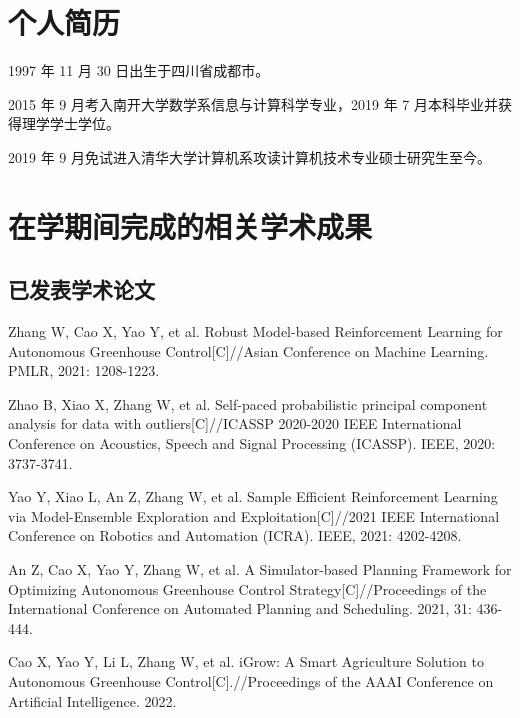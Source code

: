
\begin{resume}

  \section*{个人简历}

  1997 年 11 月 30 日出生于四川省成都市。

  2015 年 9 月考入南开大学数学系信息与计算科学专业，2019 年 7 月本科毕业并获得理学学士学位。

  2019 年 9 月免试进入清华大学计算机系攻读计算机技术专业硕士研究生至今。


  \section*{在学期间完成的相关学术成果}

  \subsection*{已发表学术论文}

  \begin{achievements}
    \item Zhang W, Cao X, Yao Y, et al. Robust Model-based Reinforcement Learning for Autonomous Greenhouse Control[C]//Asian Conference on Machine Learning. PMLR, 2021: 1208-1223.
    \item Zhao B, Xiao X, Zhang W, et al. Self-paced probabilistic principal component analysis for data with outliers[C]//ICASSP 2020-2020 IEEE International Conference on Acoustics, Speech and Signal Processing (ICASSP). IEEE, 2020: 3737-3741.
    \item Yao Y, Xiao L, An Z, Zhang W, et al. Sample Efficient Reinforcement Learning via Model-Ensemble Exploration and Exploitation[C]//2021 IEEE International Conference on Robotics and Automation (ICRA). IEEE, 2021: 4202-4208.
    \item An Z, Cao X, Yao Y, Zhang W, et al. A Simulator-based Planning Framework for Optimizing Autonomous Greenhouse Control Strategy[C]//Proceedings of the International Conference on Automated Planning and Scheduling. 2021, 31: 436-444.
    \item Cao X, Yao Y, Li L, Zhang W, et al. iGrow: A Smart Agriculture Solution to Autonomous Greenhouse Control[C].//Proceedings of the AAAI Conference on Artificial Intelligence. 2022.
  \end{achievements}
  

\end{resume}
